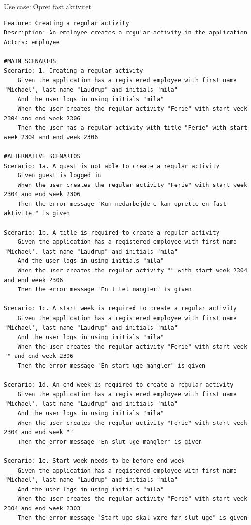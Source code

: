 \begin{listing}[H]
    \centering
    \caption{Use case: Opret fast aktivitet}\label{lst:usecase_regular_activity}
    \begin{verbatim}  
Feature: Creating a regular activity
Description: An employee creates a regular activity in the application
Actors: employee

#MAIN SCENARIOS
Scenario: 1. Creating a regular activity
    Given the application has a registered employee with first name "Michael", last name "Laudrup" and initials "mila"
    And the user logs in using initials "mila" 
    When the user creates the regular activity "Ferie" with start week 2304 and end week 2306
    Then the user has a regular activity with title "Ferie" with start week 2304 and end week 2306

#ALTERNATIVE SCENARIOS
Scenario: 1a. A guest is not able to create a regular activity
    Given guest is logged in
    When the user creates the regular activity "Ferie" with start week 2304 and end week 2306
    Then the error message "Kun medarbejdere kan oprette en fast aktivitet" is given

Scenario: 1b. A title is required to create a regular activity
    Given the application has a registered employee with first name "Michael", last name "Laudrup" and initials "mila"
    And the user logs in using initials "mila"
    When the user creates the regular activity "" with start week 2304 and end week 2306
    Then the error message "En titel mangler" is given

Scenario: 1c. A start week is required to create a regular activity
    Given the application has a registered employee with first name "Michael", last name "Laudrup" and initials "mila"
    And the user logs in using initials "mila"
    When the user creates the regular activity "Ferie" with start week "" and end week 2306
    Then the error message "En start uge mangler" is given

Scenario: 1d. An end week is required to create a regular activity
    Given the application has a registered employee with first name "Michael", last name "Laudrup" and initials "mila"
    And the user logs in using initials "mila"
    When the user creates the regular activity "Ferie" with start week 2304 and end week ""
    Then the error message "En slut uge mangler" is given

Scenario: 1e. Start week needs to be before end week
    Given the application has a registered employee with first name "Michael", last name "Laudrup" and initials "mila"
    And the user logs in using initials "mila"
    When the user creates the regular activity "Ferie" with start week 2304 and end week 2303
    Then the error message "Start uge skal være før slut uge" is given


\end{verbatim}
\end{listing}
